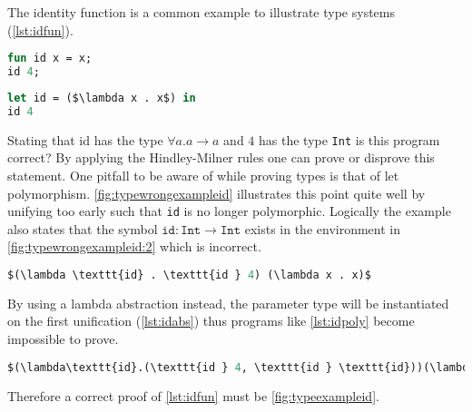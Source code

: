 \documentclass[11pt,oneside,a4paper]{report}
\begin{document}
\begin{exmp}
\label{exmp:letpoly}
The identity function is a common example to illustrate type systems (\autoref{lst:idfun}).
\begin{lstlisting}[language=ML,caption={Identity function in $L$},label={lst:idfun}]
fun id x = x;
id 4;
\end{lstlisting}
\begin{lstlisting}[language=ML,caption={Identity function in lambda calculus with let},label={lst:idfun},mathescape=true]
let id = ($\lambda x . x$) in
id 4
\end{lstlisting}
Stating that id has the type $\forall a.a \rightarrow a$ and $4$ has the type \texttt{Int} is this program correct?
By applying the Hindley-Milner rules one can prove or disprove this statement.
One pitfall to be aware of while proving types is that of let polymorphism.
\autoref{fig:typewrongexampleid} illustrates this point quite well by unifying too early such that \texttt{id} is no longer polymorphic.
Logically the example also states that the symbol $\texttt{id}: \texttt{Int} \rightarrow \texttt{Int}$ exists in the environment in \autoref{fig:typewrongexampleid:2} which is incorrect.
\begin{lstlisting}[language=ML,caption={Identity as lambda abstraction},label={lst:idabs},mathescape=true]
$(\lambda \texttt{id} . \texttt{id } 4) (\lambda x . x)$
\end{lstlisting}
By using a lambda abstraction instead, the parameter type will be instantiated on the first unification (\autoref{lst:idabs}) thus programs like \autoref{lst:idpoly} become impossible to prove.
\begin{lstlisting}[language=ML,caption={Identity with multiple instantiations},label={lst:idpoly},mathescape=true]
$(\lambda\texttt{id}.(\texttt{id } 4, \texttt{id } \texttt{id}))(\lambda x.x)$
\end{lstlisting}
Therefore a correct proof of \autoref{lst:idfun} must be \autoref{fig:typeexampleid}.
\begin{figure}[ht]
    \begin{mdframed}[style=bigbox]
        \begin{subfigure}[b]{1\textwidth}
        \begin{prooftree}

\end{prooftree}
\end{subfigure}
\end{mdframed}
\end{figure}
\end{exmp}
\end{document}
